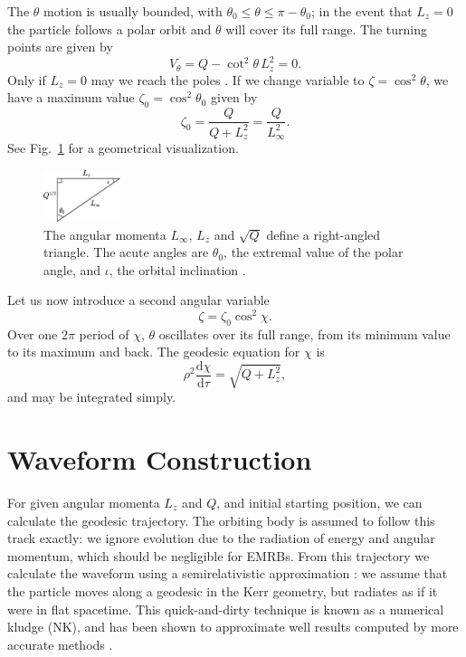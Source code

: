 \documentclass[useAMS,usedcolumn,usegraphicx,usenatbib]{mn2e}
\newcommand{\figref}[1]{Fig.~\ref{fig:#1}}
\newcommand{\dd}{\ensuremath{\mathrm{d}}}
\newcommand{\diff}[2]{\ensuremath{\frac{\dd {#1}}{\dd {#2}}}}
\begin{document}
The $\theta$ motion is usually bounded, with $\theta_0 \leq \theta \leq \pi - \theta_0$; in the event that $L_z = 0$ the particle follows a polar orbit and $\theta$ will cover its full range. The turning points are given by
\begin{equation}
V_\theta = Q - \cot^2\theta\, L_z^2 = 0.
\end{equation}
Only if $L_z = 0$ may we reach the poles \citep{Wilkins1972}. If we change variable to $\zeta = \cos^2\theta$, we have a maximum value $\zeta_0 = \cos^2\theta_0$ given by
\begin{equation}
\label{eq:theta_0}
\zeta_0 = \frac{Q}{Q+L_z^2} = \frac{Q}{L_\infty^2}.
\end{equation}
See \figref{L_triangle} for a geometrical visualization.
\begin{figure}
\begin{center}
\includegraphics[width=0.2\textwidth]{Triangle.eps}
    \caption{The angular momenta $L_\infty$, $L_z$ and $\sqrt{Q}$ define a right-angled triangle. The acute angles are $\theta_0$, the extremal value of the polar angle, and $\iota$, the orbital inclination \citep{Glampedakis2002a}.}
   \label{fig:L_triangle}
\end{center}
\end{figure}
Let us now introduce a second angular variable \citep{Drasco2004}
\begin{equation}
\zeta = \zeta_0\cos^2\chi.
\end{equation}
Over one $2\pi$ period of $\chi$, $\theta$ oscillates over its full range, from its minimum value to its maximum and back. The geodesic equation for $\chi$ is
\begin{equation}
\rho^2\diff{\chi}{\tau} = \sqrt{Q + L_z^2},
\end{equation}
and may be integrated simply.

\section{Waveform Construction}\label{sec:Kludge}

For given angular momenta $L_z$ and $Q$, and initial starting position, we can calculate the geodesic trajectory. The orbiting body is assumed to follow this track exactly: we ignore evolution due to the radiation of energy and angular momentum, which should be negligible for EMRBs. From this trajectory we calculate the waveform using a semirelativistic approximation \citep{Ruffini1981}: we assume that the particle moves along a geodesic in the Kerr geometry, but radiates as if it were in flat spacetime. This quick-and-dirty technique is known as a numerical kludge (NK), and has been shown to approximate well results computed by more accurate methods \citep{Babak2007}.
\end{document}
